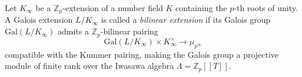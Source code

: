 Let $K_\infty$ be a $\mathbb{Z}_p$-extension of a number field $K$ containing the $p$-th roots of unity. A Galois extension $L/K_\infty$ is called a \textit{bilinear extension} if its Galois group $\text{Gal}(L/K_\infty)$ admits a $\mathbb{Z}_p$-bilinear pairing
$$\text{Gal}(L/K_\infty) \times K_\infty^\times \to \mu_{p^\infty}$$
compatible with the Kummer pairing, making the Galois group a projective module of finite rank over the Iwasawa algebra $\Lambda = \mathbb{Z}_p[[T]]$.
